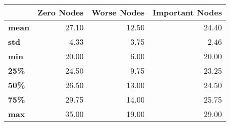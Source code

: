 \begin{tabular}{lrrr}
\toprule
{} &  Zero Nodes &  Worse Nodes &  Important Nodes \\
\midrule
\textbf{mean} &       27.10 &        12.50 &            24.40 \\
\textbf{std } &        4.33 &         3.75 &             2.46 \\
\textbf{min } &       20.00 &         6.00 &            20.00 \\
\textbf{25\% } &       24.50 &         9.75 &            23.25 \\
\textbf{50\% } &       26.50 &        13.00 &            24.50 \\
\textbf{75\% } &       29.75 &        14.00 &            25.75 \\
\textbf{max } &       35.00 &        19.00 &            29.00 \\
\bottomrule
\end{tabular}
